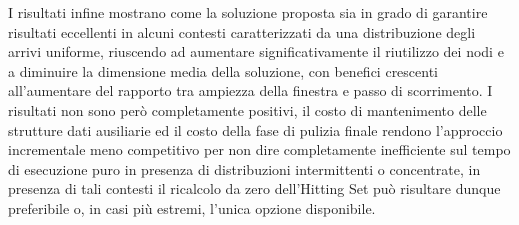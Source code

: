 I risultati infine mostrano come la soluzione proposta sia in grado di garantire risultati eccellenti in alcuni contesti caratterizzati da una distribuzione degli arrivi uniforme, riuscendo ad aumentare significativamente il riutilizzo dei nodi e a diminuire la dimensione media della soluzione, con benefici crescenti all'aumentare del rapporto tra ampiezza della finestra e passo di scorrimento.
I risultati non sono però completamente positivi, il costo di mantenimento delle strutture dati ausiliarie ed il costo della fase di pulizia finale rendono l'approccio incrementale meno competitivo per non dire completamente inefficiente sul tempo di esecuzione puro in presenza di distribuzioni intermittenti o concentrate, in presenza di tali contesti il ricalcolo da zero dell'Hitting Set può risultare dunque preferibile o, in casi più estremi, l'unica opzione disponibile.